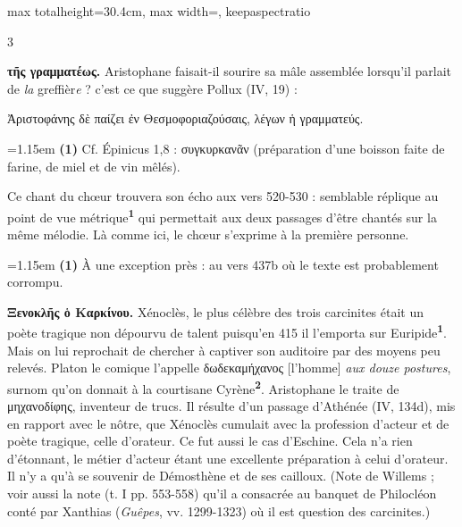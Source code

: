 \documentclass[11pt,twoside]{book}
\newcommand{\italique}[1]{\textit{#1}}
\newcommand{\citComm}[1]{\begin{quoting}[vskip=0.4pt,leftmargin=0.7em,rightmargin=0.2em]#1\end{quoting}}
\newcommand{\marqueur}[1]{\textsuperscript{\color{rubricRed}\textbf{#1}}}
\begin{document}
\begin{adjustbox}{max totalheight=30.4cm, max width=\textwidth, keepaspectratio}
\begin{minipage}{\textwidth}
{\begin{multicols}{3}
\par\vspace{1.5pt}
 \textbf{τῆς γραμματέως.} Aristophane faisait-il sourire sa mâle assemblée lorsqu'il parlait de \italique{la} greffièr\italique{e} ? c'est ce que suggère Pollux (IV, 19) :
\citComm{Ἀριστοφάνης δὲ παίζει ἐν Θεσμοφοριαζούσαις, λέγων ἡ γραμματεύς.}
\par\vspace{1.5pt}
\par\vspace{1.2pt}\par\nopagebreak\vspace{1pt}\noindent\hangindent=1.15em {\color{sepiaNote}\textbf{(1)}} Cf. Épinicus 1,8 : συγκυρκανᾶν (préparation d'une boisson faite de farine, de miel et de vin mêlés).
\par\vspace{1.5pt}
 \textbf{} Ce chant du chœur trouvera son écho aux vers 520-530 : semblable réplique au point de vue métrique\marqueur{1} qui permettait aux deux passages d'être chantés sur la même mélodie. Là comme ici, le chœur s'exprime à la première personne.
\par\vspace{1.5pt}
\par\vspace{1.2pt}\par\nopagebreak\vspace{1pt}\noindent\hangindent=1.15em {\color{sepiaNote}\textbf{(1)}} À une exception près : au vers 437b où le texte est probablement corrompu.
\par\vspace{1.5pt}
 \textbf{Ξενοκλῆς ὁ Καρκίνου.} Xénoclès, le plus célèbre des trois carcinites était un poète tragique non dépourvu de talent puisqu'en 415 il l'emporta sur Euripide\marqueur{1}. Mais on lui reprochait de chercher à captiver son auditoire par des moyens peu relevés. Platon le comique l'appelle δωδεκαμήχανος [l'homme] \italique{aux douze postures}, surnom qu'on donnait à la courtisane Cyrène\marqueur{2}. Aristophane le traite de μηχανοδίφης, inventeur de trucs. Il résulte d'un passage d'Athénée (IV, 134d), mis en rapport avec le nôtre, que Xénoclès cumulait avec la profession d'acteur et de poète tragique, celle d'orateur. Ce fut aussi le cas d'Eschine. Cela n'a rien d'étonnant, le métier d'acteur étant une excellente préparation à celui d'orateur. Il n'y a qu'à se souvenir de Démosthène et de ses cailloux. (Note de Willems ; voir aussi la note (t. I pp. 553-558) qu'il a consacrée au banquet de Philocléon conté par Xanthias (\italique{Guêpes}, vv. 1299-1323) où il est question des carcinites.)

\end{multicols}}
\end{minipage}
\end{adjustbox}
\end{document}
